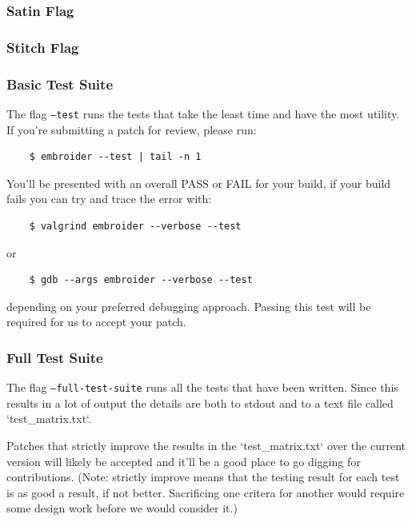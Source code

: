 \documentclass[a4paper, 11pt]{report}
\begin{document}
\subsubsection{Satin Flag}

\subsubsection{Stitch Flag}

\subsubsection{Basic Test Suite}

The flag \texttt{--test} runs the tests that take the least time and have the most utility. If you're submitting a patch for review, please run:

\begin{verbatim}
    $ embroider --test | tail -n 1
\end{verbatim}

You'll be presented with an overall PASS or FAIL for your build,
if your build fails you can try and trace the error with:

\begin{verbatim}
    $ valgrind embroider --verbose --test
  \end{verbatim}

or

\begin{verbatim}
    $ gdb --args embroider --verbose --test
  \end{verbatim}

depending on your preferred debugging approach. Passing this test
will be required for us to accept your patch.

\subsubsection{Full Test Suite}

The flag \texttt{--full-test-suite} runs all the tests that have been written.
Since this results in a lot of output the details are both to stdout
and to a text file called `test\_matrix.txt`.

Patches that strictly improve the results in the `test\_matrix.txt` over
the current version will likely be accepted and it'll be a good place
to go digging for contributions. (Note: strictly improve means that
the testing result for each test is as good a result, if not better.
Sacrificing one critera for another would require some design work
before we would consider it.)
\end{document}
